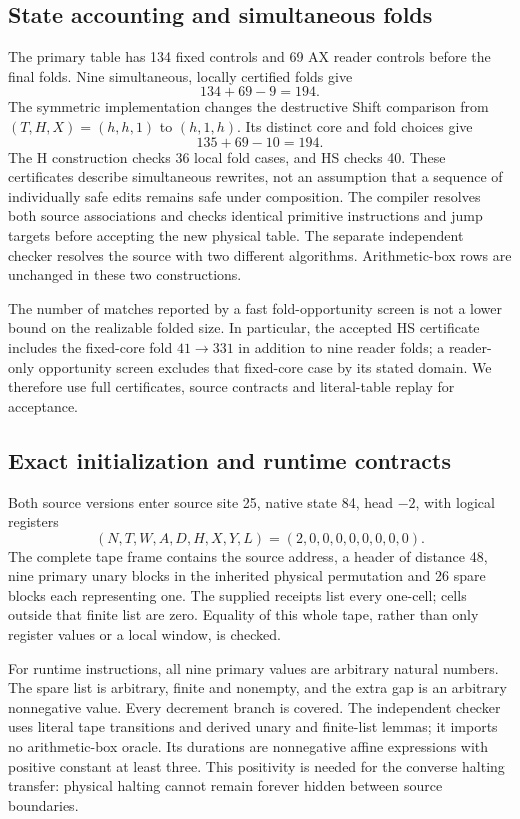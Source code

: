\documentclass[11pt,a4paper]{article}
\begin{document}
\subsection{State accounting and simultaneous folds}

The primary table has 134 fixed controls and 69 AX reader controls before
the final folds. Nine simultaneous, locally certified folds give
\[
                 134+69-9=194.
\]
The symmetric implementation changes the destructive Shift comparison
from $(T,H,X)=(h,h,1)$ to $(h,1,h)$. Its distinct core and fold choices
give
\[
                 135+69-10=194.
\]
The H construction checks 36 local fold cases, and HS checks 40. These
certificates describe simultaneous rewrites, not an assumption that a
sequence of individually safe edits remains safe under composition.
The compiler resolves both source associations and checks identical
primitive instructions and jump targets before accepting the new physical
table. The separate independent checker resolves the source with two
different algorithms. Arithmetic-box rows are
unchanged in these two constructions.

The number of matches reported by a fast fold-opportunity screen is not
a lower bound on the realizable folded size. In particular, the accepted
HS certificate includes the fixed-core fold $41\to331$ in addition to
nine reader folds; a reader-only opportunity screen excludes that fixed-core
case by its stated domain. We therefore use full certificates, source
contracts and literal-table replay for acceptance.

\subsection{Exact initialization and runtime contracts}

Both source versions enter source site 25, native state 84, head $-2$,
with logical registers
\[
        (N,T,W,A,D,H,X,Y,L)=(2,0,0,0,0,0,0,0,0).
\]
The complete tape frame contains the source address, a header of distance
48, nine primary unary blocks in the inherited physical permutation and
26 spare blocks each representing one. The supplied receipts list every
one-cell; cells outside that finite list are zero. Equality of this whole
tape, rather than only register values or a local window, is checked.

For runtime instructions, all nine primary values are arbitrary natural
numbers. The spare list is arbitrary, finite and nonempty, and the extra
gap is an arbitrary nonnegative value. Every decrement branch is covered.
The independent checker uses literal tape transitions and derived unary
and finite-list lemmas; it imports no arithmetic-box oracle. Its durations
are nonnegative affine expressions with positive constant at least three.
This positivity is needed for the converse halting transfer: physical
halting cannot remain forever hidden between source boundaries.
\end{document}
